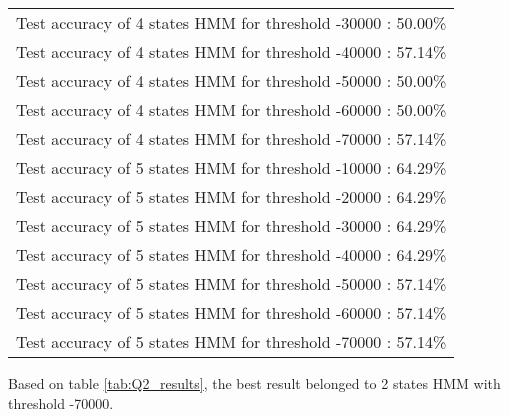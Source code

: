 \begin{table}[H]
\begin{tabular}{l}
    Test accuracy of 4 states HMM for threshold -30000 : 50.00\% \\
    Test accuracy of 4 states HMM for threshold -40000 : 57.14\% \\
    Test accuracy of 4 states HMM for threshold -50000 : 50.00\% \\
    Test accuracy of 4 states HMM for threshold -60000 : 50.00\% \\
    Test accuracy of 4 states HMM for threshold -70000 : 57.14\% \\
    Test accuracy of 5 states HMM for threshold -10000 : 64.29\% \\
    Test accuracy of 5 states HMM for threshold -20000 : 64.29\% \\
    Test accuracy of 5 states HMM for threshold -30000 : 64.29\% \\
    Test accuracy of 5 states HMM for threshold -40000 : 64.29\% \\
    Test accuracy of 5 states HMM for threshold -50000 : 57.14\% \\
    Test accuracy of 5 states HMM for threshold -60000 : 57.14\% \\
    Test accuracy of 5 states HMM for threshold -70000 : 57.14\% \\
\bottomrule

\end{tabular}
\end{table}

Based on table \ref{tab:Q2_results}, the best result belonged to 2 states HMM with threshold -70000.



 
